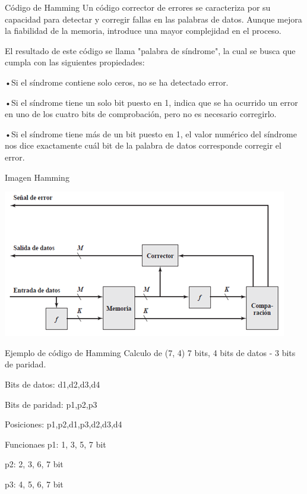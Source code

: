 \documentclass[presentation]{beamer}
\begin{document}
\begin{frame}[label={sec:orgf8a9dd1}]{Código de Hamming}
Un código corrector de errores se caracteriza por su capacidad para detectar y corregir fallas en las palabras de datos. Aunque mejora la fiabilidad de la memoria, introduce una mayor complejidad en el proceso.

El resultado de este código se llama "palabra de síndrome", la cual se busca que cumpla con las siguientes propiedades:

•Si el síndrome contiene solo ceros, no se ha detectado error.

•Si el síndrome tiene un solo bit puesto en 1, indica que se ha ocurrido un error en uno de los cuatro bits de comprobación, pero no es necesario corregirlo.

•Si el síndrome tiene más de un bit puesto en 1, el valor numérico del síndrome nos dice exactamente cuál bit de la palabra de datos corresponde corregir el error. 
\end{frame}
\begin{frame}[label={sec:orgb011659}]{Imagen Hamming}
\begin{center}
\includegraphics[width=.9\linewidth]{./imagenes/hamming.png}
\end{center}
\end{frame}

\begin{frame}[label={sec:org626836b}]{Ejemplo de código de Hamming}
Calculo de (7, 4) 7 bits, 4 bits de datos - 3 bits de paridad.

Bits de datos:  d1,d2,d3,d4

Bits de paridad: p1,p2,p3

Posiciones: p1,p2,d1,p3,d2,d3,d4

Funcionaes
p1: 1, 3, 5, 7 bit

p2: 2, 3, 6, 7 bit

p3: 4, 5, 6, 7 bit
\end{frame}
\end{document}
